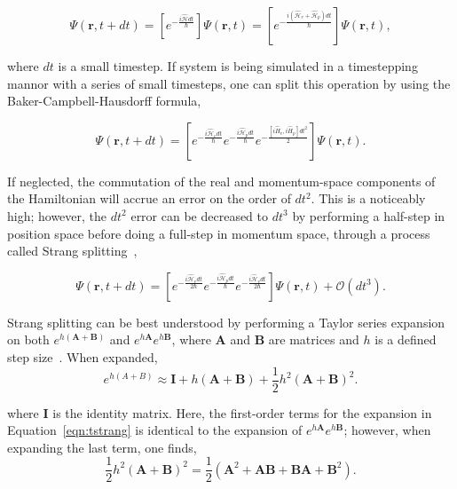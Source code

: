 \begin{equation}
\Psi(\mathbf{r},t + dt) = \left[e^{-\frac{i\mathcal{\hat{H}}dt}{\hbar}}\right]\Psi(\mathbf{r},t) = \left[e^{-\frac{i(\mathcal{\hat{H}}_v + \mathcal{\hat{H}}_p)dt}{\hbar}}\right]\Psi(\mathbf{r},t),
\end{equation}

\noindent where $dt$ is a small timestep.
If system is being simulated in a timestepping mannor with a series of small timesteps, one can split this operation by using the Baker-Campbell-Hausdorff formula,

\begin{equation}
\Psi(\mathbf{r},t+dt) = \left[e^{-\frac{i\mathcal{\hat{H}}_vdt}{\hbar}}e^{-\frac{i\mathcal{\hat{H}}_pdt}{\hbar}}e^{-\frac{[i\hat{H}_v, i\hat{H}_p]dt^2}{2}}\right]\Psi(\mathbf{r},t).
\label{eqn:rsolve}
\end{equation}

\noindent If neglected, the commutation of the real and momentum-space components of the Hamiltonian will accrue an error on the order of $dt^2$.
This is a noticeably high;
however, the $dt^2$ error can be decreased to $dt^3$ by performing a half-step in position space before doing a full-step in momentum space, through a process called Strang splitting~\cite{strang1968},

\begin{equation}
\Psi(\mathbf{r},t+dt) = \left[e^{-\frac{i\mathcal{\hat{H}}_vdt}{2\hbar}}e^{-\frac{i\mathcal{\hat{H}}_pdt}{\hbar}}e^{-\frac{i\mathcal{\hat{H}}_vdt}{2\hbar}} \right]\Psi(\mathbf{r},t) + \mathcal{O}(dt^3).
\end{equation}

Strang splitting can be best understood by performing a Taylor series expansion on both $e^{h(\mathbf{A}+\mathbf{B})}$ and $e^{h\mathbf{A}}e^{h\mathbf{B}}$, where $\mathbf{A}$ and $\mathbf{B}$ are matrices and $h$ is a defined step size~\cite{macnamara2016}.
When expanded,
\begin{equation}
e^{h(A+B)} \approx \mathbf{I} + h(\mathbf{A} + \mathbf{B}) + \frac{1}{2}h^2(\mathbf{A} + \mathbf{B})^2.
\label{eqn:tstrang}
\end{equation}

\noindent where $\mathbf{I}$ is the identity matrix.
Here, the first-order terms for the expansion in Equation~\eqref{eqn:tstrang} is identical to the expansion of $e^{h\mathbf{A}}e^{h\mathbf{B}}$; however, when expanding the last term, one finds,
\begin{equation}
\frac{1}{2}h^2(\mathbf{A} + \mathbf{B})^2 = \frac{1}{2}\left( \mathbf{A}^2 + \mathbf{AB} + \mathbf{BA} + \mathbf{B}^2\right).
\end{equation}

